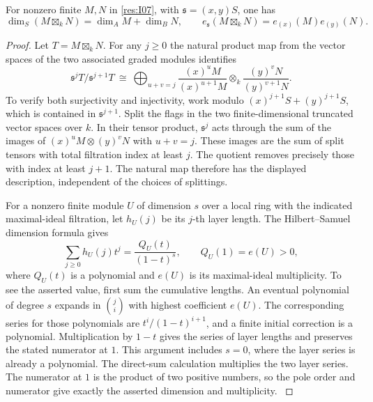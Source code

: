 \begin{lemma}\label{res:I08}
For nonzero finite \(M,N\) in \ref{res:I07}, with
\(\mathfrak s=(x,y)S\), one has
\[
 \dim_S(M\boxtimes_k N)=\dim_A M+\dim_B N,\qquad
 e_{\mathfrak s}(M\boxtimes_k N)=e_{(x)}(M)e_{(y)}(N).
\]
\end{lemma}
\begin{proof}
Let \(T=M\boxtimes_k N\). For any \(j\ge 0\) the natural product map
from the vector spaces of the two associated graded modules identifies
\[
 \mathfrak s^jT/\mathfrak s^{j+1}T
   \ \cong\
 \bigoplus_{u+v=j}
       \frac{(x)^uM}{(x)^{u+1}M}
              \otimes_k\frac{(y)^vN}{(y)^{v+1}N}.
\]
To verify both surjectivity and injectivity, work modulo
\((x)^{j+1}S+(y)^{j+1}S\), which is contained in
\(\mathfrak s^{j+1}\). Split the flags in the two finite-dimensional
truncated vector spaces over \(k\). In their tensor product,
\(\mathfrak s^j\) acts through the sum of the images of
\((x)^uM\otimes (y)^vN\) with \(u+v=j\). These images are the sum of
split tensors with total filtration index at least \(j\).
The quotient removes precisely those with index at least \(j+1\).
The natural map therefore has the displayed description, independent
of the choices of splittings.

For a nonzero finite module \(U\) of dimension \(s\) over a local
ring with the indicated maximal-ideal filtration, let \(h_U(j)\)
be its \(j\)-th layer length. The Hilbert--Samuel dimension formula
gives
\[
 \sum_{j\ge 0}h_U(j)t^j=\frac{Q_U(t)}{(1-t)^s},
 \qquad Q_U(1)=e(U)>0 ,
\]
where \(Q_U(t)\) is a polynomial and \(e(U)\) is its maximal-ideal
multiplicity. To see the asserted value, first sum the cumulative
lengths. An eventual polynomial of degree \(s\) expands in
\(\binom{j}{i}\) with highest coefficient \(e(U)\).
The corresponding series for those polynomials are
\(t^i/(1-t)^{i+1}\), and a finite initial correction is a polynomial.
Multiplication by \(1-t\) gives the series of layer lengths and
preserves the stated numerator at \(1\). This argument includes
\(s=0\), where the layer series is already a polynomial.
The direct-sum calculation multiplies the two layer series. The
numerator at \(1\) is the product of two positive numbers, so the
pole order and numerator give exactly the asserted dimension and
multiplicity. \cite[Chapter V, \S B.3]{serre-local}
\end{proof}

